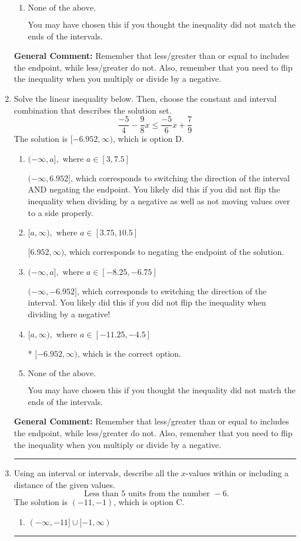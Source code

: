 \documentclass{extbook}[14pt]
\newcommand{\litem}[1]{\item #1

\rule{\textwidth}{0.4pt}}
\begin{document}
\begin{enumerate}
{\begin{enumerate}[label=\Alph*.]
* $(-0.333, \infty)$, which is the correct option.
\item \( \text{None of the above}. \)

You may have chosen this if you thought the inequality did not match the ends of the intervals.
\end{enumerate}

\textbf{General Comment:} Remember that less/greater than or equal to includes the endpoint, while less/greater do not. Also, remember that you need to flip the inequality when you multiply or divide by a negative.
}
\litem{
Solve the linear inequality below. Then, choose the constant and interval combination that describes the solution set.
\[ \frac{-5}{4} - \frac{9}{8} x \leq \frac{-5}{6} x + \frac{7}{9} \]The solution is \( [-6.952, \infty) \), which is option D.\begin{enumerate}[label=\Alph*.]
\item \( (-\infty, a], \text{ where } a \in [3, 7.5] \)

 $(-\infty, 6.952]$, which corresponds to switching the direction of the interval AND negating the endpoint. You likely did this if you did not flip the inequality when dividing by a negative as well as not moving values over to a side properly.
\item \( [a, \infty), \text{ where } a \in [3.75, 10.5] \)

 $[6.952, \infty)$, which corresponds to negating the endpoint of the solution.
\item \( (-\infty, a], \text{ where } a \in [-8.25, -6.75] \)

 $(-\infty, -6.952]$, which corresponds to switching the direction of the interval. You likely did this if you did not flip the inequality when dividing by a negative!
\item \( [a, \infty), \text{ where } a \in [-11.25, -4.5] \)

* $[-6.952, \infty)$, which is the correct option.
\item \( \text{None of the above}. \)

You may have chosen this if you thought the inequality did not match the ends of the intervals.
\end{enumerate}

\textbf{General Comment:} Remember that less/greater than or equal to includes the endpoint, while less/greater do not. Also, remember that you need to flip the inequality when you multiply or divide by a negative.
}
\litem{
Using an interval or intervals, describe all the $x$-values within or including a distance of the given values.
\[ \text{ Less than } 5 \text{ units from the number } -6. \]The solution is \( (-11, -1) \), which is option C.\begin{enumerate}[label=\Alph*.]
\item \( (-\infty, -11] \cup [-1, \infty) \)


\end{enumerate}}
\end{enumerate}
\end{document}
